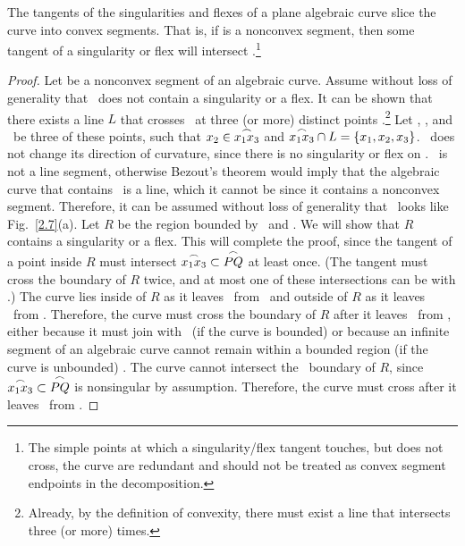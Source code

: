 \begin{theorem}
\label{deke}
The tangents of the singularities and flexes of a plane algebraic curve slice
the curve into convex segments.  That is, if  is a nonconvex 
segment, then some tangent of a singularity or flex will intersect 
.\footnote{The simple points at which a singularity/flex 
	tangent touches, but does not cross, the curve are redundant and should 
	not be treated as convex segment endpoints in the decomposition.}
\end{theorem}
%
%
\begin{proof}
Let  be a nonconvex segment of an algebraic curve.
Assume without loss of generality that \pq\ does not contain a singularity or 
a flex.
It can be shown that there exists a line $L$ that crosses \pq\ at three 
(or more) distinct points \cite[p. 117]{jj}.\footnote{Already, by the definition
	of convexity, there must exist a line that intersects  three
	(or more) times.}
Let \xo, \xt, and \xth\ be three of these points, such that $\mbox{$x_{2}$} \in \mbox{$\stackrel{\frown}{\mbox{$x_{1}$}\mbox{$x_{3}$}}$}$ 
and \mbox{$\mbox{$\stackrel{\frown}{\mbox{$x_{1}$}\mbox{$x_{3}$}}$} \cap L = \{ \mbox{$x_{1}$},\mbox{$x_{2}$},\mbox{$x_{3}$}\}$}.
\xotha\ does not change its direction of curvature, since there is no 
singularity or flex on \pq.
\xotha\ is not a line segment, otherwise Bezout's theorem would imply that
the algebraic curve that contains \xotha\ is a line, which it cannot be since
it contains a nonconvex segment.
Therefore, it can be assumed without loss of generality that \xotha\ looks like 
Fig.~\ref{2.7}(a).
Let $R$ be the region bounded by \xotha\ and \seg{\xo\xth}.
We will show that $R$ contains a singularity or a flex.
This will complete the proof, since the tangent
of a point inside $R$ must intersect $\mbox{$\stackrel{\frown}{\mbox{$x_{1}$}\mbox{$x_{3}$}}$} \subset \mbox{$\stackrel{\frown}{PQ}$}$ at least once.
(The tangent must cross the boundary of $R$ twice, and at most one of these
intersections can be with 
\seg{\xo\xth}.)
The curve lies inside of $R$ as it leaves \xotha\ from \xo\ and outside 
of $R$ as it leaves \xotha\ from \xth.
Therefore, the curve must cross the boundary of $R$ after it leaves \xotha\
from \xo, either because it must join with \xth\ (if the curve is bounded)
or because an infinite segment of an algebraic curve
cannot remain within a bounded region (if the curve is unbounded) \cite[p. 116]{jj}.
The curve cannot intersect the \xotha\ boundary of $R$, since
\mbox{$\mbox{$\stackrel{\frown}{\mbox{$x_{1}$}\mbox{$x_{3}$}}$} \subset \mbox{$\stackrel{\frown}{PQ}$}$} is nonsingular by assumption.
Therefore, the curve must cross \seg{\xo\xth} after it leaves
\xotha\ from \xo.


\end{proof}
